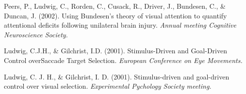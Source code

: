 \documentclass[a4paper, 10pt]{article}
\renewenvironment{itemize}{
  \begin{list}{}{
    \setlength{\leftmargin}{1.5em}
  }
}{
  \end{list}
}
\begin{document}
\begin{itemize}
\item Peers, P., Ludwig, C., Rorden, C., Cusack, R., Driver, J., Bundesen, C., \& Duncan, J. (2002). Using Bundesen's theory of visual attention to quantify attentional deficits following unilateral brain injury. {\it Annual meeting Cognitive Neuroscience Society.}
\item Ludwig, C.J.H., \& Gilchrist, I.D. (2001). Stimulus-Driven and Goal-Driven Control overSaccade Target Selection. {\it European Conference on Eye Movements.}
\item Ludwig, C. J. H., \& Gilchrist, I. D. (2001). Stimulus-driven and goal-driven control over visual selection. {\it Experimental Pychology Society meeting.}
\end{itemize}
\end{document}
